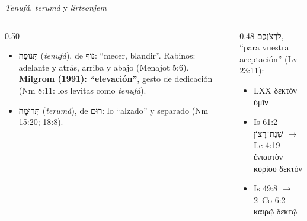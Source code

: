 \documentclass[hyperref={bookmarks=false},aspectratio=169]{beamer}
\newcommand{\heb}[1]{\mbox{\foreignlanguage{hebrew}{#1}}}
\newcommand{\grc}[1]{\foreignlanguage{ancientgreek}{#1}}
\newcommand{\destacar}[1]{\textbf{\textcolor{tierraroja}{#1}}}
\begin{document}
\begin{frame}{\emph{Tenufá}, \emph{terumá} y \emph{lirtsonjem}}
\begin{columns}[t,onlytextwidth]
\begin{column}{0.50\textwidth}\small\RaggedRight
\begin{itemize}
\item \heb{תְּנוּפָה} (\emph{tenufá}), de \heb{נוף}: ``mecer, blandir''. Rabinos: adelante y atrás, arriba y abajo (Menajot 5:6). \destacar{Milgrom (1991): ``elevación''}, gesto de dedicación (Nm 8:11: los levitas como \emph{tenufá}).
\item \heb{תְּרוּמָה} (\emph{terumá}), de \heb{רוּם}: lo ``alzado'' y separado (Nm 15:20; 18:8).
\end{itemize}
\end{column}
\begin{column}{0.48\textwidth}\small\RaggedRight
\heb{לִרְצֹנְכֶם}, ``para vuestra aceptación'' (Lv 23:11):
\begin{itemize}
\item LXX \grc{δεκτὸν ὑμῖν}
\item Is 61:2 \heb{שְׁנַת־רָצוֹן} $\rightarrow$ Lc 4:19 \grc{ἐνιαυτὸν κυρίου δεκτόν}
\item Is 49:8 $\rightarrow$ 2~Co 6:2 \grc{καιρῷ δεκτῷ}
\end{itemize}
\end{column}
\end{columns}
\end{frame}
\end{document}
